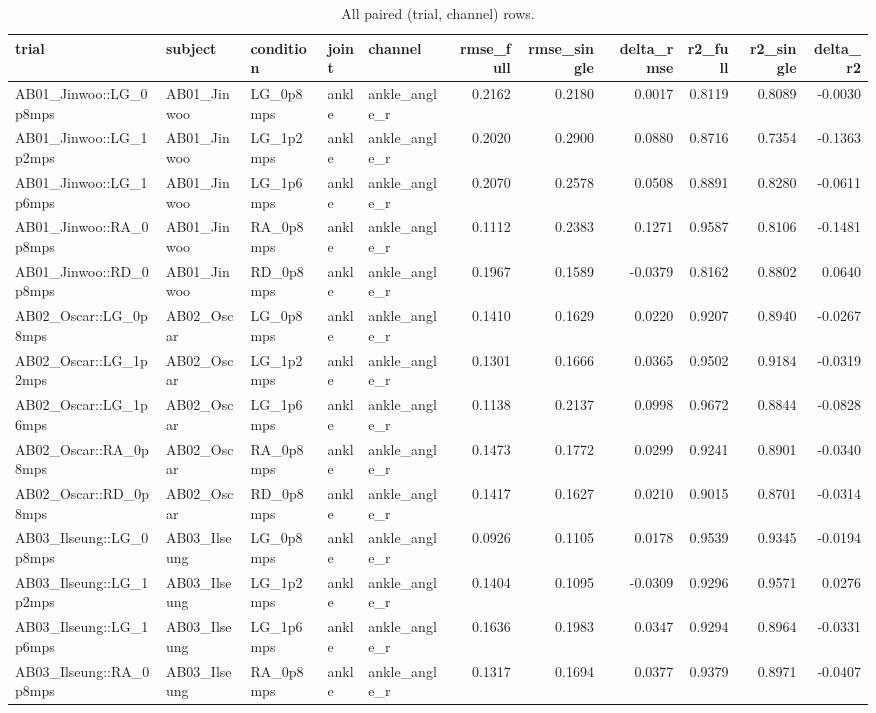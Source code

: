 \begin{table}
\caption{All paired (trial, channel) rows.}
\label{tab:table4_paired}
\begin{tabular}{lllllrrrrrr}
\toprule
trial & subject & condition & joint & channel & rmse_full & rmse_single & delta_rmse & r2_full & r2_single & delta_r2 \\
\midrule
AB01_Jinwoo::LG_0p8mps & AB01_Jinwoo & LG_0p8mps & ankle & ankle_angle_r & 0.2162 & 0.2180 & 0.0017 & 0.8119 & 0.8089 & -0.0030 \\
AB01_Jinwoo::LG_1p2mps & AB01_Jinwoo & LG_1p2mps & ankle & ankle_angle_r & 0.2020 & 0.2900 & 0.0880 & 0.8716 & 0.7354 & -0.1363 \\
AB01_Jinwoo::LG_1p6mps & AB01_Jinwoo & LG_1p6mps & ankle & ankle_angle_r & 0.2070 & 0.2578 & 0.0508 & 0.8891 & 0.8280 & -0.0611 \\
AB01_Jinwoo::RA_0p8mps & AB01_Jinwoo & RA_0p8mps & ankle & ankle_angle_r & 0.1112 & 0.2383 & 0.1271 & 0.9587 & 0.8106 & -0.1481 \\
AB01_Jinwoo::RD_0p8mps & AB01_Jinwoo & RD_0p8mps & ankle & ankle_angle_r & 0.1967 & 0.1589 & -0.0379 & 0.8162 & 0.8802 & 0.0640 \\
AB02_Oscar::LG_0p8mps & AB02_Oscar & LG_0p8mps & ankle & ankle_angle_r & 0.1410 & 0.1629 & 0.0220 & 0.9207 & 0.8940 & -0.0267 \\
AB02_Oscar::LG_1p2mps & AB02_Oscar & LG_1p2mps & ankle & ankle_angle_r & 0.1301 & 0.1666 & 0.0365 & 0.9502 & 0.9184 & -0.0319 \\
AB02_Oscar::LG_1p6mps & AB02_Oscar & LG_1p6mps & ankle & ankle_angle_r & 0.1138 & 0.2137 & 0.0998 & 0.9672 & 0.8844 & -0.0828 \\
AB02_Oscar::RA_0p8mps & AB02_Oscar & RA_0p8mps & ankle & ankle_angle_r & 0.1473 & 0.1772 & 0.0299 & 0.9241 & 0.8901 & -0.0340 \\
AB02_Oscar::RD_0p8mps & AB02_Oscar & RD_0p8mps & ankle & ankle_angle_r & 0.1417 & 0.1627 & 0.0210 & 0.9015 & 0.8701 & -0.0314 \\
AB03_Ilseung::LG_0p8mps & AB03_Ilseung & LG_0p8mps & ankle & ankle_angle_r & 0.0926 & 0.1105 & 0.0178 & 0.9539 & 0.9345 & -0.0194 \\
AB03_Ilseung::LG_1p2mps & AB03_Ilseung & LG_1p2mps & ankle & ankle_angle_r & 0.1404 & 0.1095 & -0.0309 & 0.9296 & 0.9571 & 0.0276 \\
AB03_Ilseung::LG_1p6mps & AB03_Ilseung & LG_1p6mps & ankle & ankle_angle_r & 0.1636 & 0.1983 & 0.0347 & 0.9294 & 0.8964 & -0.0331 \\
AB03_Ilseung::RA_0p8mps & AB03_Ilseung & RA_0p8mps & ankle & ankle_angle_r & 0.1317 & 0.1694 & 0.0377 & 0.9379 & 0.8971 & -0.0407 \\

\end{tabular}
\end{table}
